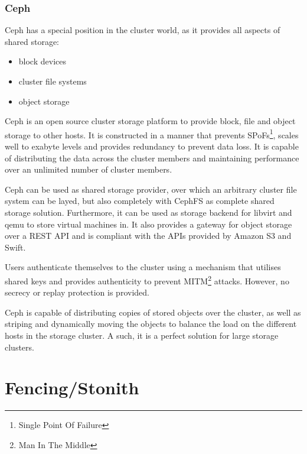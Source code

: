 \subsubsection{Ceph}
Ceph has a special position in the cluster world, as it provides all aspects of shared storage:
\begin{itemize}
\item block devices
\item cluster file systems
\item object storage
\end{itemize}

Ceph is an open source cluster storage platform to provide block, file and object storage to other hosts. It is constructed in a manner that prevents SPoFs\footnote{Single Point Of Failure}, scales well to exabyte levels and provides redundancy to prevent data loss. It is capable of distributing the data across the cluster members and maintaining performance over an unlimited number of cluster members.

Ceph can be used as shared storage provider, over which an arbitrary cluster file system can be layed, but also completely with CephFS as complete shared storage solution. Furthermore, it can be used as storage backend for libvirt and qemu to store virtual machines in. It also provides a gateway for object storage over a REST API and is compliant with the APIs provided by Amazon S3 and Swift.%

Users authenticate themselves to the cluster using a mechanism that utilises shared keys and provides authenticity to prevent MITM\footnote{Man In The Middle} attacks. However, no secrecy or replay protection is provided\cite{ceph_architecture}.

Ceph is capable of distributing copies of stored objects over the cluster, as well as striping and dynamically moving the objects to balance the load on the different hosts in the storage cluster. A such, it is a perfect solution for large storage clusters.

\section{Fencing/Stonith}
